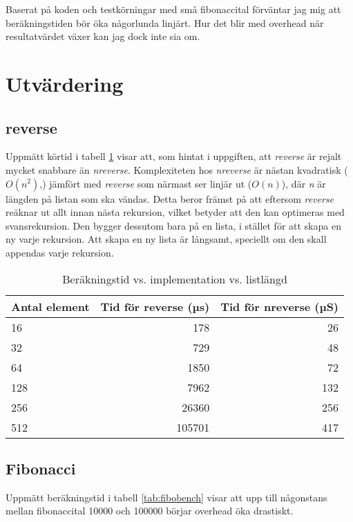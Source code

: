 \documentclass[a4paper, 11pt]{article}
\begin{document}
Baserat på koden och testkörningar med små fibonaccital förväntar jag mig att beräkningstiden bör öka någorlunda linjärt. Hur det blir med overhead när resultatvärdet växer kan jag dock inte sia om.






\section{Utvärdering}

\subsection{reverse}

Uppmätt körtid i tabell \ref{tab:reverse} visar att, som hintat i uppgiften, att \emph{reverse} är rejalt mycket snabbare än \emph{nreverse}. Komplexiteten hos \emph{nreverse} är nästan kvadratisk ($O(n^2)$,) jämfört med \emph{reverse} som närmast ser linjär ut ($O(n)$), där \emph{n} är längden på listan som ska vändas. Detta beror främst på att eftersom \emph{reverse} reäknar ut allt innan nästa rekursion, vilket betyder att den kan optimeras med svansrekursion. Den bygger dessutom bara på en lista, i stället för att skapa en ny varje rekursion. Att skapa en ny lista är långsamt, speciellt om den skall appendas varje rekursion.

\begin{table}
\centering
\begin{tabular}{|l|r|r|}
\hline
Antal element & Tid för reverse (µs) & Tid för nreverse (µS)\\
\hline
16 & 178 & 26 \\
\hline
32 & 729 & 48 \\
\hline
64 & 1850 & 72 \\
\hline
128 & 7962 & 132 \\
\hline
256 & 26360 & 256 \\
\hline
512 & 105701 & 417 \\
\hline
\end{tabular}
\caption{Beräkningstid vs. implementation vs. listlängd}
\label{tab:reverse}
\end{table}




\subsection{Fibonacci}

Uppmätt beräkningstid i tabell \ref{tab:fibobench} visar att upp till någonstans mellan fibonaccital 10000 och 100000 börjar overhead öka drastiskt.
\end{document}
